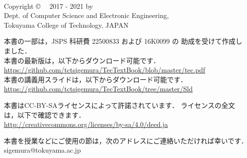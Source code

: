 \documentclass[a4paper,twocolumn,twoside]{ltjsbook}   %
\begin{document}
\thispagestyle{empty}
\onecolumn
~
\vfill
\begin{flushleft}
Copyright \copyright ~~ 2017 - 2021 by \\
Dept. of Computer Science and Electronic Engineering, \\
Tokuyama College of Technology, JAPAN
\end{flushleft}
\vspace{0.4cm}
\begin{flushleft}
本書の一部は，JSPS 科研費 22500833 および 16K0099 の
助成を受けて作成しました．\\
本書の最新版は，以下からダウンロード可能です．\\
\url{https://github.com/tctsigemura/TecTextBook/blob/master/tec.pdf}\\
本書の講義用スライドは，以下からダウンロード可能です．\\
\url{https://github.com/tctsigemura/TecTextBook/tree/master/Sld}
\end{flushleft}
\vspace{0.4cm}
\begin{flushleft}
本書はCC-BY-SAライセンスによって許諾されています．
ライセンスの全文は，以下で確認できます．\\
\url{http://creativecommons.org/licenses/by-sa/4.0/deed.ja}
\end{flushleft}
\begin{flushleft}
本書を授業などにご使用の節は，次のアドレスにご連絡いただければ幸いです．\\
sigemura@tokuyama.ac.jp
\end{flushleft}

\setcounter{tocdepth}{2}
\tableofcontents

\twocolumn
\mainmatter

\appendix
\end{document}
